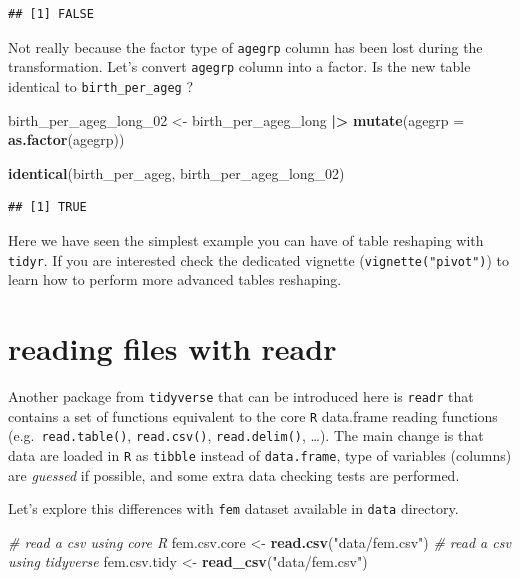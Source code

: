 \documentclass[
]{book}
\newenvironment{Shaded}{\begin{snugshade}}{\end{snugshade}}
\newcommand{\AttributeTok}[1]{\textcolor[rgb]{0.13,0.29,0.53}{#1}}
\newcommand{\CommentTok}[1]{\textcolor[rgb]{0.56,0.35,0.01}{\textit{#1}}}
\newcommand{\FunctionTok}[1]{\textcolor[rgb]{0.13,0.29,0.53}{\textbf{#1}}}
\newcommand{\NormalTok}[1]{#1}
\newcommand{\OtherTok}[1]{\textcolor[rgb]{0.56,0.35,0.01}{#1}}
\newcommand{\SpecialCharTok}[1]{\textcolor[rgb]{0.81,0.36,0.00}{\textbf{#1}}}
\newcommand{\StringTok}[1]{\textcolor[rgb]{0.31,0.60,0.02}{#1}}
\theoremstyle{definition}
\theoremstyle{definition}
\theoremstyle{definition}
\theoremstyle{definition}
\theoremstyle{remark}
\begin{document}
\begin{verbatim}
## [1] FALSE
\end{verbatim}

Not really because the factor type of \texttt{agegrp} column has been lost during the transformation.
Let's convert \texttt{agegrp} column into a factor. Is the new table identical to \texttt{birth\_per\_ageg} ?

\begin{Shaded}
\begin{Highlighting}[]
\NormalTok{birth\_per\_ageg\_long\_02 }\OtherTok{\textless{}{-}}
\NormalTok{  birth\_per\_ageg\_long }\SpecialCharTok{|\textgreater{}}
  \FunctionTok{mutate}\NormalTok{(}\AttributeTok{agegrp =} \FunctionTok{as.factor}\NormalTok{(agegrp))}

\FunctionTok{identical}\NormalTok{(birth\_per\_ageg, birth\_per\_ageg\_long\_02)}
\end{Highlighting}
\end{Shaded}

\begin{verbatim}
## [1] TRUE
\end{verbatim}

Here we have seen the simplest example you can have of table reshaping with \texttt{tidyr}. If you are interested check the dedicated vignette (\texttt{vignette("pivot")}) to learn how to perform more advanced tables reshaping.

\section{reading files with readr}\label{reading-files-with-readr}

Another package from \texttt{tidyverse} that can be introduced here is \texttt{readr} that contains a set of functions equivalent to the core \texttt{R} data.frame reading functions (e.g.~\texttt{read.table()}, \texttt{read.csv()}, \texttt{read.delim()}, \ldots). The main change is that data are loaded in \texttt{R} as \texttt{tibble} instead of \texttt{data.frame}, type of variables (columns) are \emph{guessed} if possible, and some extra data checking tests are performed.

Let's explore this differences with \texttt{fem} dataset available in \texttt{data} directory.

\begin{Shaded}
\begin{Highlighting}[]
\CommentTok{\# read a csv using core R}
\NormalTok{fem.csv.core }\OtherTok{\textless{}{-}} \FunctionTok{read.csv}\NormalTok{(}\StringTok{"data/fem.csv"}\NormalTok{)}
\CommentTok{\# read a csv using tidyverse}
\NormalTok{fem.csv.tidy }\OtherTok{\textless{}{-}} \FunctionTok{read\_csv}\NormalTok{(}\StringTok{"data/fem.csv"}\NormalTok{)}
\end{Highlighting}
\end{Shaded}
\end{document}
